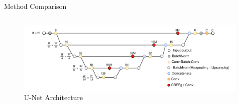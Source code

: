 \documentclass[aspectratio=169]{beamer}
\begin{document}
\begin{frame}{Method Comparison}
\begin{columns}[t]
    \begin{column}{0.5\textwidth}
      \centering
      \begin{figure}
          \centering \includegraphics[width=1\textwidth]{Figures/unet_arch.pdf}
          \caption{U-Net Architecture}
      \end{figure}
    \end{column}
  \end{columns}




\end{frame}
\end{document}
